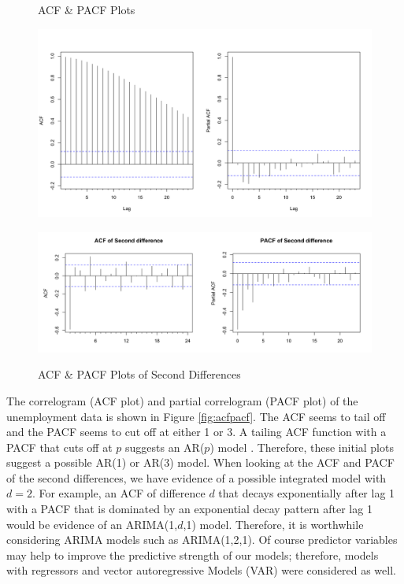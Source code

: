 \documentclass[twoside,twocolumn]{article}
\begin{document}
    \begin{figure}[hbt]
    	\centering
     	\caption{ACF \& PACF Plots}
     	\includegraphics[width=\linewidth]{images/acfpacf}
     	\label{fig:acfpacf}
     	\caption{ACF \& PACF Plots of Second Differences}
     	\includegraphics[width=\linewidth]{images/acfpacf2d}
     	\label{fig:acfpacf2}
      \end{figure}

  The correlogram (ACF plot) and partial correlogram (PACF plot) of the unemployment data is shown in Figure \ref{fig:acfpacf}. The ACF seems to tail off and the PACF seems to cut off at either 1 or 3.  A tailing ACF function with a PACF that cuts off at \(p\) suggests an AR(\(p\)) model \citep{Box2008}. Therefore, these initial plots suggest a possible AR(1) or AR(3) model. When looking at the ACF and PACF of the second differences, we have evidence of a possible integrated model with \(d=2\). For example, an ACF of difference \(d\) that decays exponentially after lag 1 with a PACF that is dominated by an exponential decay pattern after lag 1 would be evidence of an ARIMA(1,\(d\),1) model. Therefore, it is worthwhile considering ARIMA models such as ARIMA(1,2,1). Of course predictor variables may help to improve the predictive strength of our models; therefore, models with regressors and vector autoregressive Models (VAR) were considered as well.
\end{document}
